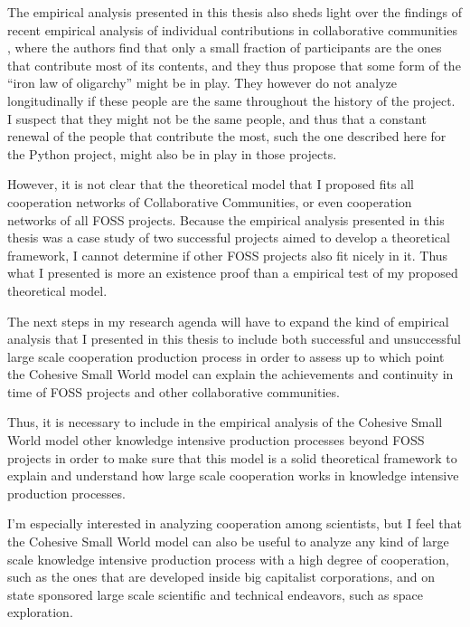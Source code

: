 The empirical analysis presented in this thesis also sheds light over the findings of recent empirical analysis of individual contributions in collaborative communities \citep{shaw:2014}, where the authors find that only a small fraction of participants are the ones that contribute most of its contents, and they thus propose that some form of the ``iron law of oligarchy'' \citep{michels:1915} might be in play. They however do not analyze longitudinally if these people are the same throughout the history of the project. I suspect that they might not be the same people, and thus that a constant renewal of the people that contribute the most, such the one described here for the Python project, might also be in play in those projects. 

However, it is not clear that the theoretical model that I proposed fits all cooperation networks of Collaborative Communities, or even cooperation networks of all FOSS projects. Because the empirical analysis presented in this thesis was a case study of two successful projects aimed to develop a theoretical framework, I cannot determine if other FOSS projects also fit nicely in it. Thus what I presented is more an existence proof than a empirical test of my proposed theoretical model.

The next steps in my research agenda will have to expand the kind of empirical analysis that I presented in this thesis to include both successful and unsuccessful large scale cooperation production process in order to assess up to which point the Cohesive Small World model can explain the achievements and continuity in time of FOSS projects and other collaborative communities.

Thus, it is necessary to include in the empirical analysis of the Cohesive Small World model other knowledge intensive production processes beyond FOSS projects in order to make sure that this model is a solid theoretical framework to explain and understand how large scale cooperation works in knowledge intensive production processes.

I'm especially interested in analyzing cooperation among scientists, but I feel that the Cohesive Small World model can also be useful to analyze any kind of large scale knowledge intensive production process with a high degree of cooperation, such as the ones that are developed inside big capitalist corporations, and on state sponsored large scale scientific and technical endeavors, such as space exploration.
